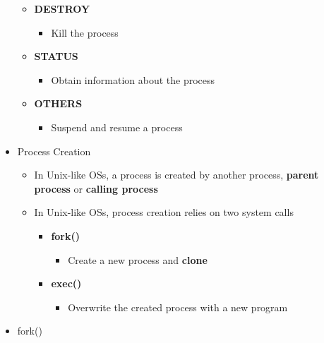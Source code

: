 \documentclass[a4paper,11pt,english]{article}
\begin{document}
\begin{itemize}
\begin{itemize}
\begin{itemize}
                \end{itemize}
            \item \textbf{\color{blue}DESTROY}
                \begin{itemize}
                    \item Kill the process 
                \end{itemize}
            \item \textbf{\color{blue}STATUS}
                \begin{itemize}
                    \item Obtain information about the process 
                \end{itemize}
            \item \textbf{\color{blue}OTHERS}
                \begin{itemize}
                    \item Suspend and resume a process 
                \end{itemize}
        \end{itemize}
    \item Process Creation
        \begin{itemize}
            \item In Unix-like OSs, a process is created by another process, \textbf{\color{blue}parent process} or \textbf{\color{blue}calling process}
            \item In Unix-like OSs, process creation relies on two system calls
                \begin{itemize}
                    \item \textbf{\color{blue}fork()}
                        \begin{itemize}
                            \item Create a new process and \textbf{\color{blue}clone } 
                        \end{itemize}
                    \item \textbf{\color{blue}exec()}
                        \begin{itemize}
                            \item Overwrite the created process with a new program 
                        \end{itemize}
                \end{itemize}
        \end{itemize}
    \item fork()
        \begin{itemize}

\end{itemize}
\end{itemize}
\end{document}
